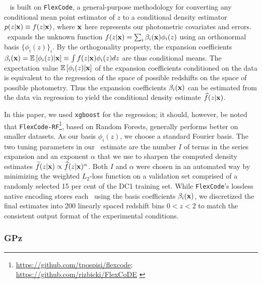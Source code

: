\flexzboost\ \citep{Izbicki:17,Dalmasso:2019} is built on \texttt{FlexCode}, a general-purpose methodology for converting any conditional mean point estimator of $z$ to a conditional density estimator $p(z \vert {\mathbf{x}}) \equiv f(z \vert {\mathbf{x}})$, where ${\mathbf{x}}$ here represents our photometric covariates and errors.
\flexzboost\ expands the unknown function $f(z \vert {\mathbf{x}}) = \sum_{i}\beta_{i}({\mathbf{x}})\phi_{i}(z)$ using an orthonormal basis $\{\phi_{i}(z)\}_{i}$.
By the orthogonality property, the expansion coefficients $\beta_{i}({\mathbf{x}}) = \mathbb{E}\left[\phi_i(z)|{\mathbf{x}}\right] \equiv \int f(z \vert {\mathbf{x}}) \phi_{i}(z) dz$ are thus conditional means.
The expectation value $\mathbb{E}\left[\phi_i(z) \vert {\mathbf{x}}\right]$ of the expansion coefficients conditioned on the data is equivalent to the regression of the space of possible redshifts on the space of possible photometry.
Thus the expansion coefficients $\beta_{i}({\mathbf{x}})$ can be estimated from the data via regression to yield the conditional density estimate $\widehat{f}(z \vert {\mathbf{x}})$.

In this paper, we used \texttt{xgboost} \citep{Chen:16} for the regression; it should, however, be noted that \texttt{FlexCode-RF}\footnote{\url{https://github.com/tpospisi/flexcode};\\ \url{https://github.com/rizbicki/FlexCoDE} \label{flexzboost_github}}, based on Random Forests, generally performs better on smaller datasets.
As our basis $\phi_{i}(z)$, we choose a standard Fourier basis.
The two tuning parameters in our \pzpdf\ estimate are the number $I$ of terms in the series expansion and an exponent $\alpha$ that we use to sharpen the computed density estimates $\widetilde{f}(z \vert {\mathbf{x}}) \propto \widehat{f}(z \vert {\mathbf{x}})^{\alpha}$.
Both $I$ and $\alpha$ were chosen in an automated way by minimizing the weighted $L_2$-loss function \citep[Eq. 5 in][]{Izbicki:17} on a validation set comprised of a randomly selected 15 per cent of the DC1 training set.
While \texttt{FlexCode}'s lossless native encoding stores each \pzpdf\ using the basis coefficients $\beta_{i}({\mathbf{x}})$, we discretized the final estimates into 200 linearly spaced redshift bins $0 < z < 2$ to match the consistent output format of the experimental conditions.


\subsubsection{GPz}
\label{sec:gpz}

